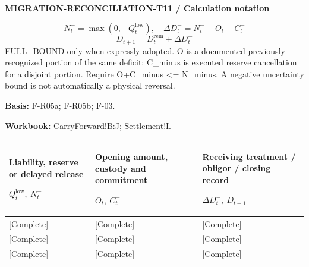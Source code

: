 \textbf{MIGRATION-RECONCILIATION-T11 / Calculation notation}\par
{\fontsize{9}{11}\selectfont\[ N_t^-=\max(0,-Q_t^{\mathrm{low}}),\quad \Delta D_t^-=N_t^- -O_t-C_t^- \]}
{\fontsize{9}{11}\selectfont\[ D_{t+1}=D_t^{\mathrm{rem}}+\Delta D_t^- \]}
FULL\_BOUND only when expressly adopted. O is a documented previously recognized portion of the same deficit; C\_minus is executed reserve cancellation for a disjoint portion. Require O+C\_minus <= N\_minus. A negative uncertainty bound is not automatically a physical reversal.\par
\textbf{Basis:} F-R05a; F-R05b; F-03.\par
\textbf{Workbook:} CarryForward!B:J; Settlement!I.\par\endgroup
{\sffamily\fontsize{8.3}{10.3}\selectfont\begin{longtable}{@{}P{54.83mm} P{54.83mm} P{54.83mm}@{}}
\toprule
\textbf{Liability, reserve or delayed release}\par {\normalfont\fontsize{8.2}{10}\selectfont $Q_t^{\mathrm{low}},\ N_t^-$} & \textbf{Opening amount, custody and commitment}\par {\normalfont\fontsize{8.2}{10}\selectfont $O_t,\ C_t^-$} & \textbf{Receiving treatment / obligor / closing record}\par {\normalfont\fontsize{8.2}{10}\selectfont $\Delta D_t^-,\ D_{t+1}$}\\\midrule\endhead
\rule{0pt}{8mm}[Complete] & [Complete] & [Complete]\\\hline
\rule{0pt}{8mm}[Complete] & [Complete] & [Complete]\\\hline
\rule{0pt}{8mm}[Complete] & [Complete] & [Complete]\\\hline
\end{longtable}}
\par\begingroup\sffamily\fontsize{8}{10}\selectfont\color{NEBGreen}\setlength{\parskip}{2pt}\setlength{\abovedisplayskip}{4pt}\setlength{\belowdisplayskip}{4pt}\setlength{\abovedisplayshortskip}{2pt}\setlength{\belowdisplayshortskip}{3pt}
